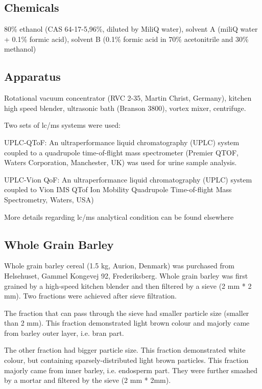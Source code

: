\subsection{Chemicals}
80\% ethanol (CAS 64-17-5,96\%, diluted by MiliQ water), solvent A (miliQ water + 0.1\% formic acid), solvent B (0.1\% formic acid in 70\% acetonitrile and 30\% methanol)

\subsection{Apparatus}
Rotational vacuum concentrator (RVC 2-35, Martin Christ, Germany), 
kitchen high speed blender, ultrasonic bath (Branson 3800), vortex mixer, centrifuge.

Two sets of \acrfull{lc/ms} systems were used: 

UPLC-QToF: An ultraperformance liquid chromatography (UPLC) system coupled to a quadrupole time-of-flight mass spectrometer (Premier QTOF, Waters Corporation, Manchester, UK) was used for urine sample analysis.

UPLC-Vion QoF: An ultraperformance liquid chromatography (UPLC) system coupled to Vion IMS QTof Ion Mobility Quadrupole Time-of-flight Mass Spectrometry, Waters, USA)

More details regarding \acrshort{lc/ms} analytical condition can be found elsewhere\cite{Jensen2016,Barri2012MetabolicCoverage.}

\subsection{Whole Grain Barley}
Whole grain barley cereal (1.5 kg, Aurion, Denmark) was purchased from Helsehuset, Gammel Kongevej 92, Frederiksberg.
Whole grain barley was first grained by a high-speed kitchen blender and then filtered by a sieve (2 mm * 2 mm). Two fractions were achieved after sieve filtration. 

The fraction that can pass through the sieve had smaller particle size (smaller than 2 mm). This fraction demonstrated light brown colour and majorly came from barley outer layer, i.e. bran part.

The other fraction had bigger particle size. This fraction demonstrated white colour, but containing sparsely-distributed light brown particles. This fraction majorly came from inner barley, i.e. endosperm part. They were further smashed by a mortar and filtered by the sieve (2 mm * 2mm).

